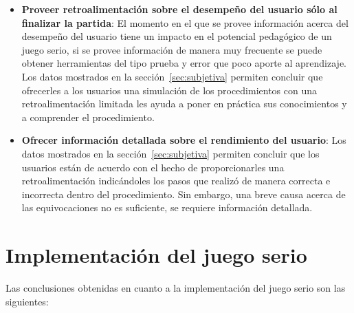 \begin{itemize}
\item \textbf{Proveer retroalimentación sobre el desempeño del usuario sólo al finalizar 
    la partida}: El momento en el que se provee información acerca del desempeño 
    del usuario tiene un impacto en el potencial pedagógico de un juego serio, 
    si se provee información de manera muy frecuente se puede obtener herramientas 
    del tipo prueba y error que poco aporte al aprendizaje. Los datos mostrados en la
    sección~\ref{sec:subjetiva} permiten concluir que ofrecerles a los usuarios
    una simulación de los procedimientos con una retroalimentación limitada les
    ayuda a poner en práctica sus conocimientos y a comprender el procedimiento. 

\item \textbf{Ofrecer información detallada sobre el rendimiento del usuario}:
    Los datos mostrados en la sección~\ref{sec:subjetiva} permiten concluir que
    los usuarios están de acuerdo con el hecho de proporcionarles una
    retroalimentación indicándoles los pasos que realizó de manera correcta e
    incorrecta dentro del procedimiento. Sin embargo, una breve causa acerca de
    las equivocaciones no es suficiente, se requiere información detallada. 

\end{itemize}

\section{Implementación del juego serio}

Las conclusiones obtenidas en cuanto a la implementación del juego serio son las 
siguientes:

